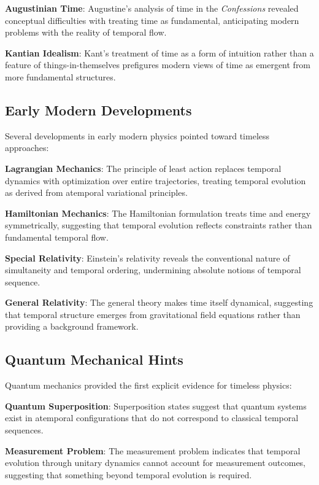 \documentclass[12pt]{article}
\begin{document}
\textbf{Augustinian Time}: Augustine's analysis of time in the \emph{Confessions} revealed conceptual difficulties with treating time as fundamental, anticipating modern problems with the reality of temporal flow.

\textbf{Kantian Idealism}: Kant's treatment of time as a form of intuition rather than a feature of things-in-themselves prefigures modern views of time as emergent from more fundamental structures.

\subsection{Early Modern Developments}

Several developments in early modern physics pointed toward timeless approaches:

\textbf{Lagrangian Mechanics}: The principle of least action replaces temporal dynamics with optimization over entire trajectories, treating temporal evolution as derived from atemporal variational principles.

\textbf{Hamiltonian Mechanics}: The Hamiltonian formulation treats time and energy symmetrically, suggesting that temporal evolution reflects constraints rather than fundamental temporal flow.

\textbf{Special Relativity}: Einstein's relativity reveals the conventional nature of simultaneity and temporal ordering, undermining absolute notions of temporal sequence.

\textbf{General Relativity}: The general theory makes time itself dynamical, suggesting that temporal structure emerges from gravitational field equations rather than providing a background framework.

\subsection{Quantum Mechanical Hints}

Quantum mechanics provided the first explicit evidence for timeless physics:

\textbf{Quantum Superposition}: Superposition states suggest that quantum systems exist in atemporal configurations that do not correspond to classical temporal sequences.

\textbf{Measurement Problem}: The measurement problem indicates that temporal evolution through unitary dynamics cannot account for measurement outcomes, suggesting that something beyond temporal evolution is required.
\end{document}
